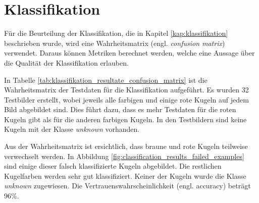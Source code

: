 \section{Klassifikation}
Für die Beurteilung der Klassifikation, die in Kapitel \ref{kap:klassifikation} beschrieben wurde, wird eine
Wahrheitsmatrix\cite{wiki:confusion_matrix} (engl. \emph{confusion matrix}) verwendet.
Daraus können Metriken berechnet werden, welche eine Aussage über die Qualität der Klassifikation erlauben.

In Tabelle \ref{tab:klassifikation_resultate_confusion_matrix} ist die Wahrheitsmatrix der Testdaten
für die Klassifikation aufgeführt. Es wurden 32 Testbilder erstellt, wobei jeweils alle farbigen und einige rote Kugeln
auf jedem Bild abgebildet sind. Dies führt dazu, dass es mehr Testdaten für die roten Kugeln gibt als für die anderen farbigen Kugeln.
In den Testbildern sind keine Kugeln mit der Klasse \emph{unknown} vorhanden.

Aus der Wahrheitsmatrix ist ersichtlich, dass braune und rote Kugeln teilweise verwechselt werden.
In Abbildung \ref{fig:classification_results_failed_examples} sind einige dieser falsch klassifizierte Kugeln abgebildet.
Die restlichen Kugelfarben werden sehr gut klassifiziert. Keiner der Kugeln wurde die Klasse \emph{unknown} zugewiesen.
Die Vertrauenswahrscheinlichkeit\cite{wiki:beurteilung_binärer_klassifikator} (engl. accuracy) beträgt 96\%.

